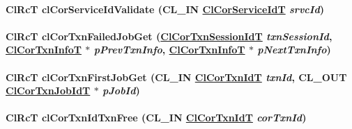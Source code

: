 \hypertarget{group__group13_ga127}{
\paragraph[clCorServiceIdValidate]{\setlength{\rightskip}{0pt plus 5cm}Cl\-Rc\-T cl\-Cor\-Service\-Id\-Validate (CL\_\-IN \hyperlink{group__group13_ga339}{Cl\-Cor\-Service\-Id\-T} {\em srvc\-Id})}\hfill}
\label{group__group13_ga127}


\hypertarget{group__group13_ga82}{
\paragraph[clCorTxnFailedJobGet]{\setlength{\rightskip}{0pt plus 5cm}Cl\-Rc\-T cl\-Cor\-Txn\-Failed\-Job\-Get (\hyperlink{group__group13_ga16}{Cl\-Cor\-Txn\-Session\-Id\-T} {\em txn\-Session\-Id}, \hyperlink{struct_cl_cor_txn_info}{Cl\-Cor\-Txn\-Info\-T} $\ast$ {\em p\-Prev\-Txn\-Info}, \hyperlink{struct_cl_cor_txn_info}{Cl\-Cor\-Txn\-Info\-T} $\ast$ {\em p\-Next\-Txn\-Info})}\hfill}
\label{group__group13_ga82}


\hypertarget{group__group13_ga78}{
\paragraph[clCorTxnFirstJobGet]{\setlength{\rightskip}{0pt plus 5cm}Cl\-Rc\-T cl\-Cor\-Txn\-First\-Job\-Get (CL\_\-IN \hyperlink{group__group13_ga17}{Cl\-Cor\-Txn\-Id\-T} {\em txn\-Id}, CL\_\-OUT \hyperlink{group__group13_ga18}{Cl\-Cor\-Txn\-Job\-Id\-T} $\ast$ {\em p\-Job\-Id})}\hfill}
\label{group__group13_ga78}


\hypertarget{group__group13_ga71}{
\paragraph[clCorTxnIdTxnFree]{\setlength{\rightskip}{0pt plus 5cm}Cl\-Rc\-T cl\-Cor\-Txn\-Id\-Txn\-Free (CL\_\-IN \hyperlink{group__group13_ga17}{Cl\-Cor\-Txn\-Id\-T} {\em cor\-Txn\-Id})}\hfill}
\label{group__group13_ga71}


